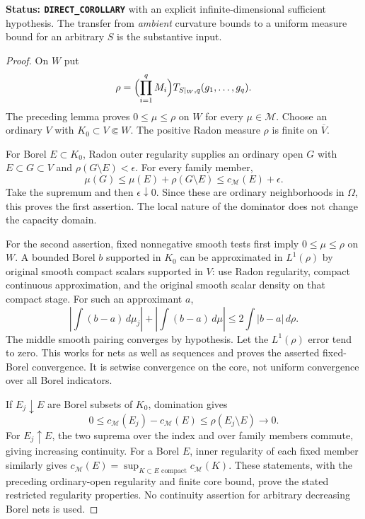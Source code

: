 \documentclass[11pt,a4paper]{article}
\numberwithin{equation}{section}
\theoremstyle{definition}
\theoremstyle{remark}
\begin{document}
\noindent\textbf{Status: \texttt{DIRECT\_COROLLARY}} with an explicit
infinite-dimensional sufficient hypothesis. The transfer from
\emph{ambient} curvature bounds to a uniform measure bound for an
arbitrary $S$ is the substantive input.

\begin{proof}
On $W$ put
\[
                 \rho=\Bigl(\prod_{i=1}^qM_i\Bigr)
                          T_{S|_W,q}(g_1,\ldots,g_q).
\]
The preceding lemma proves $0\le\mu\le\rho$ on $W$ for every
$\mu\in\mathscr M$. Choose an ordinary $V$ with
$K_0\subset V\Subset W$. The positive Radon measure $\rho$ is
finite on $\overline V$.

For Borel $E\subset K_0$, Radon outer regularity supplies an ordinary
open $G$ with $E\subset G\subset V$ and
$\rho(G\setminus E)<\epsilon$. For every family member,
\[
            \mu(G)\le\mu(E)+\rho(G\setminus E)
                                      \le c_{\mathscr M}(E)+\epsilon.
\]
Take the supremum and then $\epsilon\downarrow0$. Since these are
ordinary neighborhoods in $\Omega$, this proves the first assertion.
The local nature of the dominator does not change the capacity domain.

For the second assertion, fixed nonnegative smooth tests first imply
$0\le\mu\le\rho$ on $W$. A bounded Borel $b$ supported in $K_0$
can be approximated in $L^1(\rho)$ by original smooth compact scalars
supported in $V$: use Radon regularity, compact continuous
approximation, and the original smooth scalar density on that compact
stage. For such an approximant $a$,
\[
 \left|\int(b-a)\,d\mu_j\right|
       +\left|\int(b-a)\,d\mu\right|
                      \le2\int|b-a|\,d\rho.
\]
The middle smooth pairing converges by hypothesis. Let the
$L^1(\rho)$ error tend to zero. This works for nets as well as
sequences and proves the asserted fixed-Borel convergence. It is
setwise convergence on the core, not uniform convergence over all
Borel indicators.

If $E_j\downarrow E$ are Borel subsets of $K_0$, domination gives
\[
       0\le c_{\mathscr M}(E_j)-c_{\mathscr M}(E)
                                 \le\rho(E_j\setminus E)\to0.
\]
For $E_j\uparrow E$, the two suprema over the index and over family
members commute, giving increasing continuity. For a Borel $E$,
inner regularity of each fixed member similarly gives
$c_{\mathscr M}(E)=\sup_{K\subset E\text{ compact}}c_{\mathscr M}(K)$.
These statements, with the preceding ordinary-open regularity and
finite core bound, prove the stated restricted regularity properties.
No continuity assertion for arbitrary decreasing Borel nets is used.
\end{proof}
\end{document}
